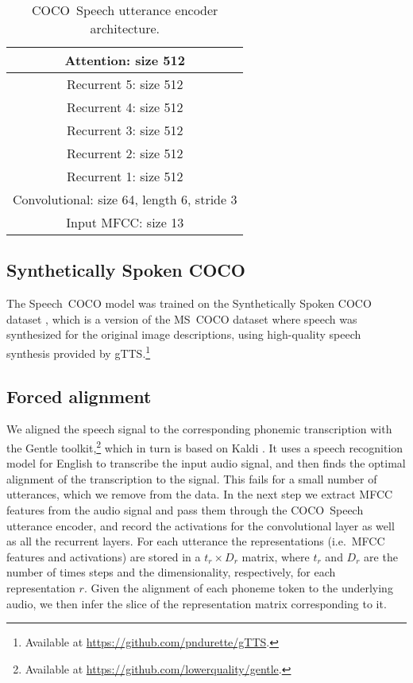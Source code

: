 \begin{table}[t]
  \centering
  \begin{tabular}{|c|}\hline
    Attention: size 512 \\\hline
    Recurrent 5: size 512 \\\hline
    Recurrent 4: size 512 \\\hline
    Recurrent 3: size 512 \\\hline
    Recurrent 2: size 512 \\\hline
    Recurrent 1: size 512 \\\hline
    Convolutional: size 64, length 6, stride 3 \\\hline\hline
    Input MFCC: size 13 \\\hline
  \end{tabular}
  \caption{COCO~Speech utterance encoder architecture.}
  \label{tab:arch}
\end{table}

\subsection{Synthetically Spoken COCO}
\label{sec:coco}
The Speech~COCO model was trained on the Synthetically Spoken COCO dataset \citep{grzegorz_chrupala_2017_400926}, which is a version of the MS~COCO dataset \citep{lin2014microsoft} where speech was synthesized for the original image descriptions, using high-quality speech synthesis provided by gTTS.\footnote{Available at \href{https://github.com/pndurette/gTTS}{https://github.com/pndurette/gTTS}.}

\subsection{Forced alignment}
\label{sec:forced}
We aligned the speech signal to the corresponding phonemic transcription with the Gentle toolkit,\footnote{Available at
  \href{https://github.com/lowerquality/gentle}{https://github.com/lowerquality/gentle}.}
which in turn is based on Kaldi \citep{Povey_ASRU2011}. It 
uses a speech recognition model for English to transcribe the input audio
signal, and then finds the optimal alignment of the transcription to
the signal. This fails for a small number of utterances, which we
remove from the data.  In the next step we extract MFCC features from
the audio signal and pass them through the COCO~Speech utterance encoder, and
record the activations for the convolutional layer as well as all the
recurrent layers. For each utterance the representations (i.e.\ MFCC
features and activations) are stored in a $t_r\times D_r$ matrix, where
$t_r$ and $D_r$ are the number of times steps and the dimensionality,
respectively, for each representation $r$. Given the alignment of each
phoneme token to the underlying audio, we then infer the slice of the
representation matrix corresponding to it.

